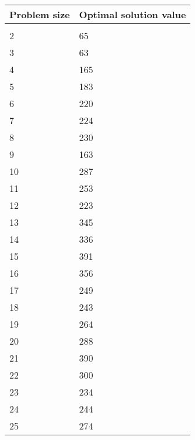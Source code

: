 \begin{tabular}{*{2}{C{65pt}}}
	\toprule
	Problem size & Optimal solution value\\
	\midrule
	&\\
	2 & 65\\
	3 & 63\\
	4 & 165\\
	5 & 183\\
	6 & 220\\
	7 & 224\\
	8 & 230\\
	9 & 163\\
	10 & 287\\
	11 & 253\\
	12 & 223\\
	13 & 345\\
	14 & 336\\
	15 & 391\\
	16 & 356\\
	17 & 249\\
	18 & 243\\
	19 & 264\\
	20 & 288\\
	21 & 390\\
	22 & 300\\
	23 & 234\\
	24 & 244\\
	25 & 274\\
	\bottomrule
\end{tabular}